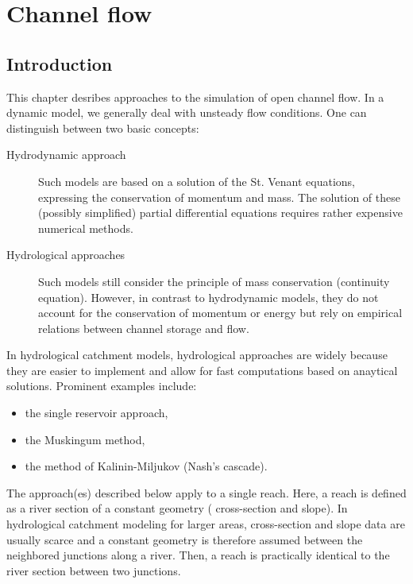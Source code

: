 \chapter{Channel flow} \label{chap:chanFlow}
\renewcommand{\tabdir}{chapters/part_processes/channelFlow/tab}
\renewcommand{\figdir}{chapters/part_processes/channelFlow/fig}

\section{Introduction} \label{sec:chanFlow_intro}

This chapter desribes approaches to the simulation of open channel flow. In a dynamic model, we generally deal with unsteady flow conditions. One can distinguish between two basic concepts:

\begin{description}
  \item[Hydrodynamic approach] Such models are based on a solution of the St. Venant equations, expressing the conservation of momentum and mass. The solution of these (possibly simplified) partial differential equations requires rather expensive numerical methods.
  \item[Hydrological approaches] Such models still consider the principle of mass conservation (continuity equation). However, in contrast to hydrodynamic models, they do not account for the conservation of momentum or energy but rely on empirical relations between channel storage and flow.
\end{description}

In hydrological catchment models, hydrological approaches are widely because they are easier to implement and allow for fast computations based on anaytical solutions. Prominent examples include:
\begin{itemize}
  \item the single reservoir approach,
  \item the Muskingum method,
  \item the method of Kalinin-Miljukov (Nash's cascade).
\end{itemize}

The approach(es) described below apply to a single reach. Here, a reach is defined as a river section of a constant geometry (\ie{} cross-section and slope). In hydrological catchment modeling for larger areas, cross-section and slope data are usually scarce and a constant geometry is therefore assumed between the neighbored junctions along a river. Then, a reach is practically identical to the river section between two junctions.

